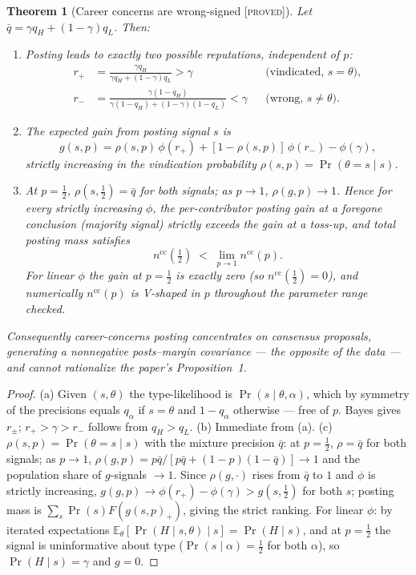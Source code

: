\documentclass[11pt]{article}
\newtheorem{theorem}{Theorem}
\theoremstyle{remark}
\newcommand{\E}{\mathbb{E}}
\newcommand{\Pro}{\Pr}
\newcommand{\statusP}{\textsc{[proved]}}
\begin{document}
\begin{theorem}[Career concerns are wrong-signed \statusP]\label{thm:career}
Let $\bar q=\gamma q_H+(1-\gamma)q_L$. Then:
\begin{enumerate}[label=(\alph*),itemsep=1pt]
\item Posting leads to exactly two possible reputations, independent of $p$:
\begin{align*}
r_+&=\frac{\gamma q_H}{\gamma q_H+(1-\gamma)q_L}>\gamma
&&\text{(vindicated, } s=\theta\text{)},\\
r_-&=\frac{\gamma(1-q_H)}{\gamma(1-q_H)+(1-\gamma)(1-q_L)}<\gamma
&&\text{(wrong, } s\ne\theta\text{)}.
\end{align*}
\item The expected gain from posting signal $s$ is
\[
g(s,p)=\rho(s,p)\,\phi(r_+)+[1-\rho(s,p)]\,\phi(r_-)-\phi(\gamma),
\]
strictly increasing in the vindication probability
$\rho(s,p)=\Pro(\theta=s\mid s)$.
\item At $p=\tfrac12$, $\rho(s,\tfrac12)=\bar q$ for both signals; as
$p\to1$, $\rho(g,p)\to1$. Hence for every strictly increasing $\phi$, the
per-contributor posting gain at a foregone conclusion (majority signal) strictly
exceeds the gain at a toss-up, and total posting mass satisfies
\[
n^{\mathrm{cc}}(\tfrac12)\;<\;\lim_{p\to1}n^{\mathrm{cc}}(p).
\]
For linear $\phi$ the gain at $p=\tfrac12$ is exactly zero (so
$n^{\mathrm{cc}}(\tfrac12)=0$), and numerically $n^{\mathrm{cc}}(p)$ is V-shaped
in $p$ throughout the parameter range checked.
\end{enumerate}
Consequently career-concerns posting concentrates on \emph{consensus}
proposals, generating a nonnegative posts--margin covariance --- the opposite
of the data --- and cannot rationalize the paper's Proposition~1.
\end{theorem}

\begin{proof}
(a) Given $(s,\theta)$ the type-likelihood is $\Pro(s\mid\theta,\alpha)$, which
by symmetry of the precisions equals $q_\alpha$ if $s=\theta$ and $1-q_\alpha$
otherwise --- free of $p$. Bayes gives $r_\pm$; $r_+>\gamma>r_-$ follows from
$q_H>q_L$. (b) Immediate from (a). (c) $\rho(s,p)=\Pro(\theta=s\mid s)$ with the
mixture precision $\bar q$: at $p=\tfrac12$, $\rho=\bar q$ for both signals; as
$p\to1$, $\rho(g,p)=p\bar q/[p\bar q+(1-p)(1-\bar q)]\to1$ and the population
share of $g$-signals $\to1$. Since $\rho(g,\cdot)$ rises from $\bar q$ to $1$
and $\phi$ is strictly increasing, $g(g,p)\to\phi(r_+)-\phi(\gamma)>g(s,\tfrac12)$
for both $s$; posting mass is $\sum_s\Pro(s)F(g(s,p)_+)$, giving the strict
ranking. For linear $\phi$: by iterated expectations
$\E_\theta[\Pro(H\mid s,\theta)\mid s]=\Pro(H\mid s)$, and at $p=\tfrac12$ the
signal is uninformative about type ($\Pro(s\mid\alpha)=\tfrac12$ for both
$\alpha$), so $\Pro(H\mid s)=\gamma$ and $g=0$.
\end{proof}
\end{document}
